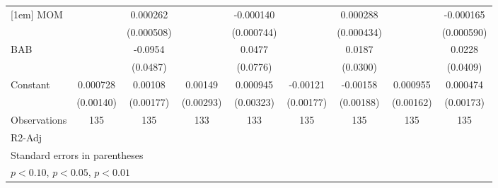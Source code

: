 \begin{table}[htbp]
\begin{tabular}{l*{8}{c}}
[1em]
MOM                 &                     &    0.000262         &                     &   -0.000140         &                     &    0.000288         &                     &   -0.000165         \\
                    &                     &  (0.000508)         &                     &  (0.000744)         &                     &  (0.000434)         &                     &  (0.000590)         \\
[1em]
BAB                 &                     &     -0.0954\sym{*}  &                     &      0.0477         &                     &      0.0187         &                     &      0.0228         \\
                    &                     &    (0.0487)         &                     &    (0.0776)         &                     &    (0.0300)         &                     &    (0.0409)         \\
[1em]
Constant            &    0.000728         &     0.00108         &     0.00149         &    0.000945         &    -0.00121         &    -0.00158         &    0.000955         &    0.000474         \\
                    &   (0.00140)         &   (0.00177)         &   (0.00293)         &   (0.00323)         &   (0.00177)         &   (0.00188)         &   (0.00162)         &   (0.00173)         \\
\hline
Observations        &         135         &         135         &         133         &         133         &         135         &         135         &         135         &         135         \\
R2-Adj              &                     &                     &                     &                     &                     &                     &                     &                     \\
\hline\hline
\multicolumn{9}{l}{\footnotesize Standard errors in parentheses}\\
\multicolumn{9}{l}{\footnotesize \sym{*} \(p<0.10\), \sym{**} \(p<0.05\), \sym{***} \(p<0.01\)}\\
\end{tabular}
\end{table}
